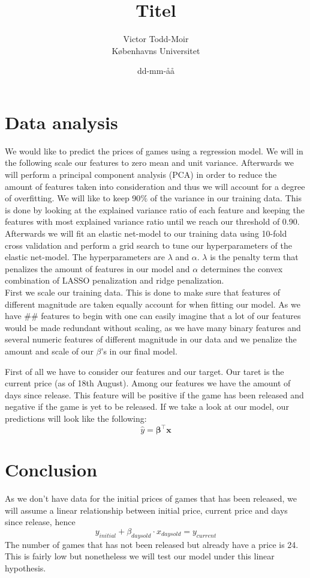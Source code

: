 \documentclass[12pt,a4paper]{article}
\author{Victor Todd-Moir\\Københavns Universitet}
\date{dd-mm-åå}
\title{Titel}
\begin{document}
	\maketitle
\section*{Data analysis}
We would like to predict the prices of games using a regression model. We will in the following scale our features to zero mean and unit variance. Afterwards we will perform a principal component analysis (PCA) in order to reduce the amount of features taken into consideration and thus we will account for a degree of overfitting. We will like to keep 90$\text{\%}$ of the variance in our training data. This is done by looking at the explained variance ratio of each feature and keeping the features with most explained variance ratio until we reach our threshold of 0.90. Afterwards we will fit an elastic net-model to our training data using 10-fold cross validation and perform a grid search to tune our hyperparameters of the elastic net-model. The hyperparameters are $\lambda$ and $\alpha$. $\lambda$ is the penalty term that penalizes the amount of features in our model and $\alpha$ determines the convex combination of LASSO penalization and ridge penalization.\\
First we scale our training data. This is done to make sure that features of different magnitude are taken equally account for when fitting our model. As we have $\#\#$ features to begin with one can easily imagine that a lot of our features would be made redundant without scaling, as we have many binary features and several numeric features of different magnitude in our data and we penalize the amount and scale of our $\beta$'s in our final model. 

First of all we have to consider our features and our target. Our taret is the current price (as of 18th August). Among our features we have the amount of days since release. This feature will be positive if the game has been released and negative if the game is yet to be released. If we take a look at our model, our predictions will look like the following:
$$\hat{y} = \boldsymbol{\beta}^\intercal\boldsymbol{x}$$


\section*{Conclusion}
As we don't have data for the initial prices of games that has been released, we will assume a linear relationship between initial price, current price and days since release, hence
$$y_{initial} + \beta_{days old}\cdot x_{days old} = y_{current}$$
The number of games that has not been released but already have a price is 24. This is fairly low but nonetheless we will test our model under this linear hypothesis. 
\end{document}
